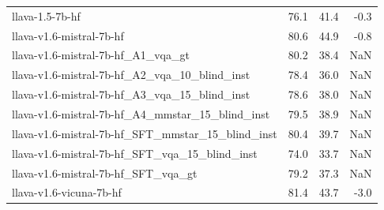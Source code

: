 \begin{tabular}{lrrr}
llava-1.5-7b-hf & 76.1 & 41.4 & -0.3 \\
llava-v1.6-mistral-7b-hf & 80.6 & 44.9 & -0.8 \\
llava-v1.6-mistral-7b-hf_A1_vqa_gt & 80.2 & 38.4 & NaN \\
llava-v1.6-mistral-7b-hf_A2_vqa_10_blind_inst & 78.4 & 36.0 & NaN \\
llava-v1.6-mistral-7b-hf_A3_vqa_15_blind_inst & 78.6 & 38.0 & NaN \\
llava-v1.6-mistral-7b-hf_A4_mmstar_15_blind_inst & 79.5 & 38.9 & NaN \\
llava-v1.6-mistral-7b-hf_SFT_mmstar_15_blind_inst & 80.4 & 39.7 & NaN \\
llava-v1.6-mistral-7b-hf_SFT_vqa_15_blind_inst & 74.0 & 33.7 & NaN \\
llava-v1.6-mistral-7b-hf_SFT_vqa_gt & 79.2 & 37.3 & NaN \\
llava-v1.6-vicuna-7b-hf & 81.4 & 43.7 & -3.0 \\
\bottomrule
\end{tabular}
